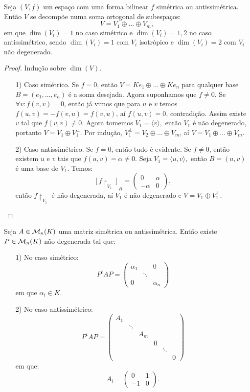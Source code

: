 \documentclass[11pt,twoside,a4paper]{book}
\begin{document}
\begin{teorema}
Seja $(V,f)$ um espaço com uma forma bilinear $f$ simétrica ou antissimétrica. Então $V$ se decompõe numa soma ortogonal de subespaços:
\[
V=V_1\oplus\dots\oplus V_m,
\]
em que $\dim(V_i)=1$ no caso simétrico e $\dim(V_i)=1,2$ no caso antissimétrico, sendo $\dim(V_i)=1$ com $V_i$ isotrópico e $\dim(V_i)=2$ com $V_i$ não degenerado.
\end{teorema}
\begin{proof}
Indução sobre $\dim(V).$
\begin{itemize}
\item[1)] Caso simétrico. Se $f=0$, então $V=Ke_1\oplus\dots\oplus Ke_n$ para qualquer base $B=(e_1,\dots,e_n)$ é a soma desejada. Agora suponhamos que $f\neq 0$. Se $\forall v:f(v,v)=0$, então já vimos que para $u$ e $v$ temos $f(u,v)=-f(v,u)=f(v,u)$, aí $f(u,v)=0$, contradição. Assim existe $v$ tal que $f(v,v)\neq0.$ Agora tomemos $V_1=\langle v\rangle,$ então $V_1$ é não degenerado, portanto $V=V_1\oplus V_1^\perp$. Por indução, $V_1^\perp=V_2\oplus\dots\oplus V_m$, aí $V=V_1\oplus\dots\oplus V_m.$
\item[2)] Caso antissimétrico. Se $f=0$, então tudo é evidente. Se $f\neq 0$, então existem $u$ e $v$ tais que $f(u,v)=\alpha\neq0.$ Seja $V_1=\langle u,v\rangle,$ então $B=(u,v)$ é uma base de $V_1.$ Temos:
\[
[f\upharpoonright_{V_1}]_B=\begin{pmatrix}
0&\alpha\\-\alpha&0
\end{pmatrix},
\]
então $f\upharpoonright_{V_1}$ é não degenerada, aí $V_1$ é não degenerado e $V=V_1\oplus V_1^\perp.$
\end{itemize}
\end{proof}

\begin{corolario}
Seja $A\in\mathcal{M}_{n}(K)$ uma matriz simétrica ou antissimétrica. Então existe $P\in\mathcal{M}_{n}(K)$ não degenerada tal que:
\begin{itemize}
\item[1)] No caso simétrico:
\[
P^tAP=\begin{pmatrix}
\alpha_1&&0\\&\ddots&\\0&&\alpha_n
\end{pmatrix}
\]
em que $\alpha_i\in K.$
\item[2)] No caso antissimétrico:
\[
P^tAP=\begin{pmatrix}
A_1&&&&&\\&\ddots&&&&\\&&A_m&&&\\&&&0&&\\&&&&\ddots&\\&&&&&0
\end{pmatrix}
\]
em que:
\[
A_i=\begin{pmatrix}
0&1\\-1&0
\end{pmatrix}.
\]
\end{itemize}
\end{corolario}
\end{document}
